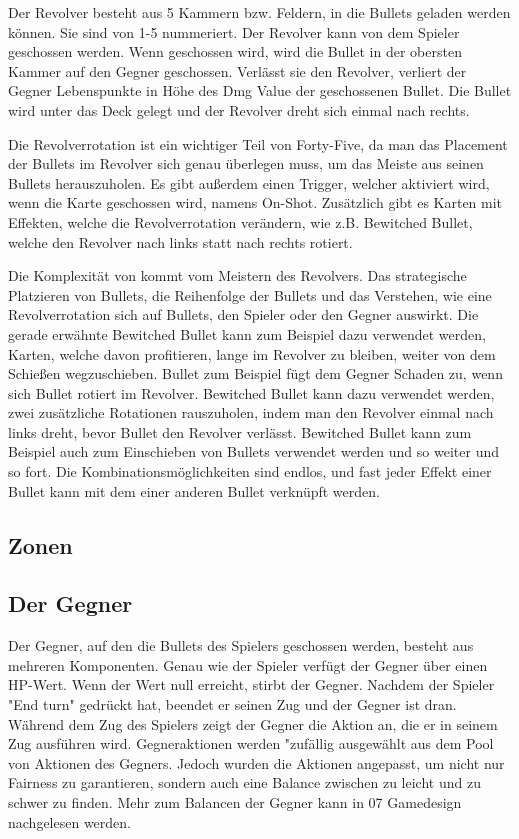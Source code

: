 Der Revolver besteht aus 5 Kammern bzw. Feldern, in die Bullets geladen werden können.
Sie sind von 1-5 nummeriert. %
Der Revolver kann von dem Spieler geschossen werden. Wenn geschossen wird, wird die Bullet in der obersten Kammer auf den Gegner geschossen.
Verlässt sie den Revolver, verliert der Gegner Lebenspunkte in Höhe des Dmg Value der geschossenen Bullet.
Die Bullet wird unter das Deck gelegt und der Revolver dreht sich einmal nach rechts.


Die Revolverrotation ist ein wichtiger Teil von Forty-Five, da man das Placement der Bullets im Revolver sich genau überlegen muss,
um das Meiste aus seinen Bullets herauszuholen. %
Es gibt außerdem einen Trigger, welcher aktiviert wird, wenn die Karte geschossen wird,
namens On-Shot. Zusätzlich gibt es Karten mit Effekten, welche die Revolverrotation verändern, wie z.B. Bewitched Bullet,
welche den Revolver nach links statt nach rechts rotiert.

Die Komplexität von \FF kommt vom Meistern des Revolvers.
Das strategische Platzieren von Bullets, die Reihenfolge der Bullets und das Verstehen, wie eine Revolverrotation sich auf Bullets,
den Spieler oder den Gegner auswirkt. Die gerade erwähnte Bewitched Bullet kann zum Beispiel dazu verwendet werden, Karten,
welche davon profitieren, lange im Revolver zu bleiben, weiter von dem Schießen wegzuschieben. Bullet zum Beispiel fügt dem Gegner Schaden zu,
wenn sich Bullet rotiert im Revolver. %
Bewitched Bullet kann dazu verwendet werden, zwei zusätzliche Rotationen rauszuholen, indem man den Revolver einmal nach
links dreht, bevor Bullet den Revolver verlässt. Bewitched Bullet kann zum Beispiel auch zum Einschieben von Bullets verwendet
werden und so weiter und so fort. Die Kombinationsmöglichkeiten sind endlos, und fast jeder Effekt einer Bullet kann mit dem einer
anderen Bullet verknüpft werden.





\subsection{Zonen}\label{backpack_and_deck}

\subsection{Der Gegner}\label{der_gegner}
Der Gegner, auf den die Bullets des Spielers geschossen werden, besteht aus mehreren Komponenten.
Genau wie der Spieler verfügt der Gegner über einen HP-Wert. Wenn der Wert null erreicht, stirbt der Gegner.
Nachdem der Spieler "End turn" gedrückt hat, beendet er seinen Zug und der Gegner ist dran. Während dem Zug des Spielers
zeigt der Gegner die Aktion an, die er in seinem Zug ausführen wird.
Gegneraktionen werden "zufällig ausgewählt aus dem Pool von Aktionen des Gegners.
Jedoch wurden die Aktionen angepasst, um nicht nur Fairness zu garantieren,
sondern auch eine Balance zwischen zu leicht und zu schwer zu finden.
Mehr zum Balancen der Gegner kann in 07 Gamedesign nachgelesen werden.



